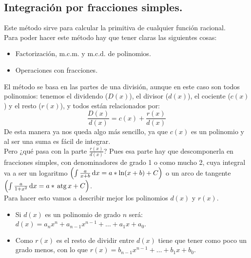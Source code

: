 \documentclass[a4paper,11pt,answers]{exam}
\begin{document}
\subsection{Integración por fracciones simples.}
Este método sirve para calcular la primitiva de cualquier función racional.\\
Para poder hacer este método hay que tener claras las siguientes cosas:
\begin{itemize}
	\item Factorización, m.c.m. y m.c.d. de polinomios.
	\item Operaciones con fracciones.
\end{itemize}

El método se basa en las partes de una división, aunque en este caso son todos polinomios: tenemos el dividendo ($D(x)$), el divisor ($d(x)$), el cociente ($c(x)$) y el resto ($r(x)$), y todos están relacionados por:
\[\frac{D(x)}{d(x)} = c(x) + \frac{r(x)}{d(x)}\]
De esta manera ya nos queda algo más sencillo, ya que $c(x)$ es un polinomio y al ser una suma es fácil de integrar.\\
Pero ¿qué pasa con la parte $\frac{r(x)}{d(x)}$? Pues esa parte hay que descomponerla en fracciones simples, con denominadores de grado 1 o como mucho 2, cuya integral va a ser un logaritmo $\left(\int \frac{a}{x+b}\,\mathrm{d}x = a*\ln(x+b) + C \right)$ o un arco de tangente $\left(\int \frac{a}{1+x^2}\,\mathrm{d}x = a*\,\mathrm{atg}\, x + C \right)$.\\

Para hacer esto vamos a describir mejor los polinomios $d(x)$ y $r(x)$.
\begin{itemize}
	\item Si $d(x)$ es un polinomio de grado $n$ será: $d(x) = a_n x^n + a_{n-1} x^{n-1} + \dots + a_1 x + a_0$.
	\item Como $r(x)$ es el resto de dividir entre $d(x)$ tiene que tener como poco un grado menos, con lo que $r(x) = 
	b_{n-1} x^{n-1} + \dots + b_1 x + b_0$.
\end{itemize}
\end{document}
